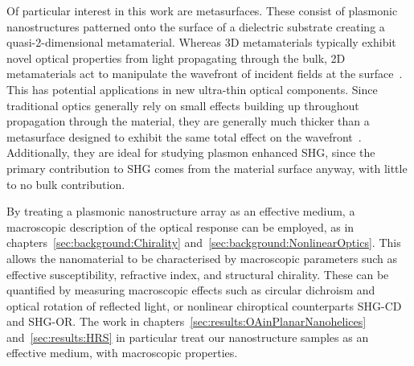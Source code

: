 Of particular interest in this work are metasurfaces. These consist of plasmonic nanostructures patterned onto the surface of a dielectric substrate creating a quasi-2-dimensional metamaterial. Whereas 3D metamaterials typically exhibit novel optical properties from light propagating through the bulk, 2D metamaterials act to manipulate the wavefront of incident fields at the surface~\cite{Meinzer2014}. This has potential applications in new ultra-thin optical components. Since traditional optics generally rely on small effects building up throughout propagation through the material, they are generally much thicker than a metasurface designed to exhibit the same total effect on the wavefront~\cite[\S 3]{Yao2014}. Additionally, they are ideal for studying plasmon enhanced SHG, since the primary contribution to SHG comes from the material surface anyway, with little to no bulk contribution. 

By treating a plasmonic nanostructure array as an effective medium, a macroscopic description of the optical response can be employed, as in chapters~\ref{sec:background:Chirality} and~\ref{sec:background:NonlinearOptics}. This allows the nanomaterial to be characterised by macroscopic parameters such as effective susceptibility, refractive index, and structural chirality. These can be quantified by measuring macroscopic effects such as circular dichroism and optical rotation of reflected light, or nonlinear chiroptical counterparts SHG-CD and SHG-OR. The work in chapters~\ref{sec:results:OAinPlanarNanohelices} and~\ref{sec:results:HRS} in particular treat our nanostructure samples as an effective medium, with macroscopic properties.


